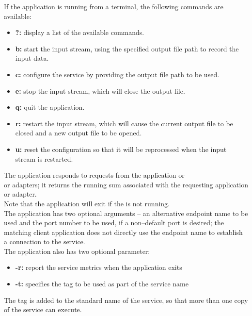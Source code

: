 If the application is running from a terminal, the following commands are available:
\begin{itemize}
\item \textbf{?:} display a list of the available commands.
\item \textbf{b:} start the input stream, using the specified output file path to record
the input data. 
\item \textbf{c:} configure the service by providing the output file path to be used. 
\item \textbf{e:} stop the input stream, which will close the output file. 
\item \textbf{q:} quit the application. 
\item \textbf{r:} restart the input stream, which will cause the current output file to be
closed and a new output file to be opened.
\item \textbf{u:} reset the configuration so that it will be reprocessed when the input
stream is restarted. 
\end{itemize}
The  application responds to
requests from the  application or\\
 or
 adapters; it returns the running sum
associated with the requesting application or adapter.\\

Note that the application will exit if the
 is not running.\\

The application has two optional arguments -- an alternative endpoint name to be used and
the port number to be used, if a non--default port is desired; the matching client
application does not directly use the endpoint name to establish a connection to the
service.\\

The application also has two optional parameter:
\begin{itemize}
\item \textbf{-r:} report the service metrics when the application exits
\item \textbf{-t:} specifies the tag to be used as part of the service name
\end{itemize}
The tag is added to the standard name of the service, so that more than one copy of the
service can execute.\\

